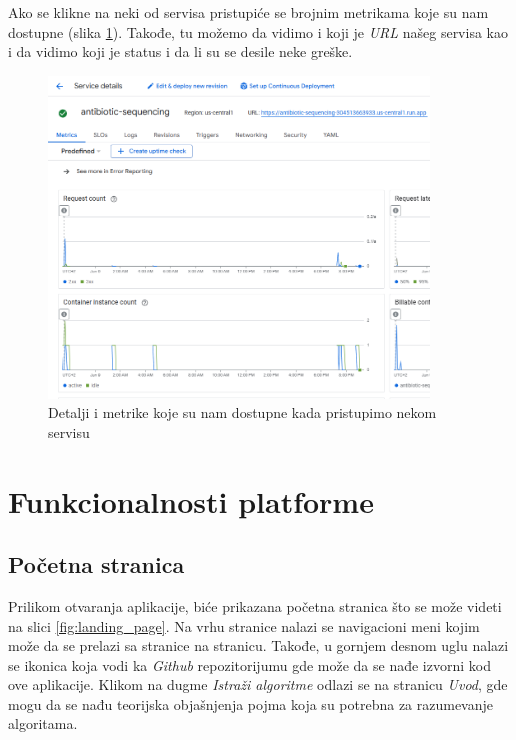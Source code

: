 \documentclass[12pt,oneside]{memoir}
\begin{document}
Ako se klikne na neki od servisa pristupiće se brojnim metrikama koje su nam dostupne (slika \ref{fig:gcr_services_details}). Takođe, tu možemo da vidimo i koji je \emph{URL} našeg servisa kao i da vidimo koji je status i da li su se desile neke greške.

\begin{figure}[h]
\centering
\includegraphics[width=0.9\textwidth]{images/gcr_services_details.png}
\caption{Detalji i metrike koje su nam dostupne kada pristupimo nekom servisu}
\label{fig:gcr_services_details}
\end{figure}


\section{Funkcionalnosti platforme}

\subsection{Početna stranica}

Prilikom otvaranja aplikacije, biće prikazana početna stranica što se može videti na slici \ref{fig:landing_page}. Na vrhu stranice nalazi se navigacioni meni kojim može da se prelazi sa stranice na stranicu. Takođe, u gornjem desnom uglu nalazi se ikonica koja vodi ka \emph{Github} repozitorijumu gde može da se nađe izvorni kod ove aplikacije.
Klikom na dugme \emph{Istraži algoritme} odlazi se na stranicu \emph{Uvod}, gde mogu da se nađu teorijska objašnjenja pojma koja su potrebna za razumevanje algoritama.
\end{document}
